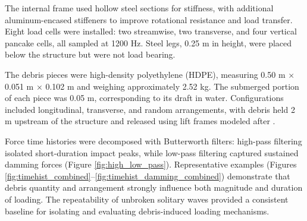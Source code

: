 \documentclass{article}
\begin{document}
The internal frame used hollow steel sections for stiffness, with additional aluminum-encased stiffeners to improve rotational resistance and load transfer. Eight load cells were installed: two streamwise, two transverse, and four vertical pancake cells, all sampled at 1200 Hz. Steel legs, 0.25 m in height, were placed below the structure but were not load bearing.
 
The debris pieces were high-density polyethylene (HDPE), measuring 0.50 m × 0.051 m × 0.102 m and weighing approximately 2.52 kg. The submerged portion of each piece was 0.05 m, corresponding to its draft in water. Configurations included longitudinal, transverse, and random arrangements, with debris held 2 m upstream of the structure and released using lift frames modeled after \citep{Shekhar2020}.

Force time histories were decomposed with Butterworth filters: high-pass filtering isolated short-duration impact peaks, while low-pass filtering captured sustained damming forces (Figure \ref{fig:high_low_pass}). Representative examples (Figures \ref{fig:timehist_combined}–\ref{fig:timehist_damming_combined}) demonstrate that debris quantity and arrangement strongly influence both magnitude and duration of loading. The repeatability of unbroken solitary waves provided a consistent baseline for isolating and evaluating debris-induced loading mechanisms.
\end{document}
